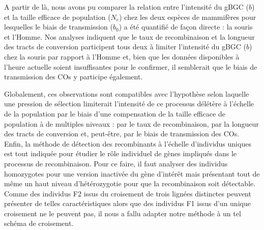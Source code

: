 {%
%
%
%

A partir de là, nous avons pu comparer la relation entre l'intensité du gBGC ($b$) et la taille efficace de population ($N_e$) chez les deux espèces de mammifères pour lesquelles le biais de transmission ($b_0$) a été quantifié de façon directe : la souris et l'Homme.
Nos analyses indiquent que le taux de recombinaison et la longueur des tracts de conversion participent tous deux à limiter l'intensité du gBGC ($b$) chez la souris par rapport à l'Homme et, bien que les données disponibles à l'heure actuelle soient insuffisantes pour le confirmer, il semblerait que le biais de transmission des COs y participe également.

Globalement, ces observations sont compatibles avec l'hypothèse selon laquelle une pression de sélection limiterait l’intensité de ce processus délétère à l’échelle de la population par le biais d'une compensation de la taille efficace de population à de multiples niveaux : par le taux de recombinaison, par la longueur des tracts de conversion et, peut-être, par le biais de transmission des COs.\\


Enfin, la méthode de détection des recombinants à l'échelle d'individus uniques est tout indiquée pour étudier le rôle individuel de gènes impliqués dans le processus de recombinaison.
Pour ce faire, il faut analyser des individus homozygotes pour une version inactivée du gène d'intérêt mais présentant tout de même un haut niveau d'hétérozygotie pour que la recombinaison soit détectable.
Comme des individus F2 issus du croisement de trois lignées distinctes peuvent présenter de telles caractéristiques alors que des individus F1 issus d'un unique croisement ne le peuvent pas, il nous a fallu adapter notre méthode à un tel schéma de croisement.

}
